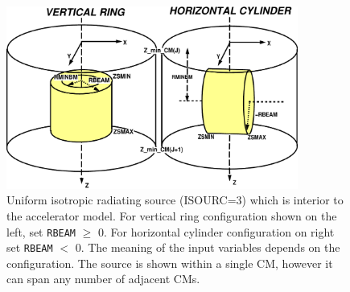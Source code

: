 \documentclass[12pt,twoside]{article}
\begin{document}
\begin{figure}[htbp]
\begin{center}
\leavevmode
\vspace{-0.8cm}
\mbox{}\hspace{0cm}
\includegraphics[height=6.0cm]{figures/src3}
\caption[ISOURC=3: Interior isotropic cylindrical source.]
{Uniform isotropic radiating source (ISOURC=3) which is interior to
the accelerator model.  For vertical ring
configuration shown on the left, set
{\tt RBEAM} $\geq$ 0.  For horizontal cylinder configuration on
right set {\tt RBEAM} $<$ 0.  The meaning of the
input variables depends on the configuration.  The
source is shown within a single CM, however it can span any number of
adjacent CMs.}
\label{fig_src3}
\end{center}
\end{figure}

\clearpage
\end{document}
